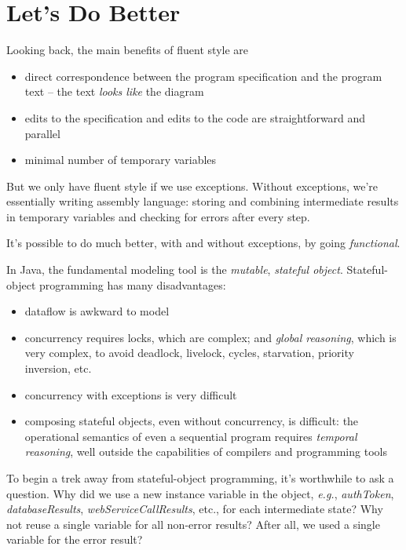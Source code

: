 \documentclass[11pt]{article}
\begin{document}
\section{Let's Do Better}
\label{sec-3}

Looking back, the main benefits of fluent style are
\begin{itemize}
\item direct correspondence between the program specification and the
program text -- the text \emph{looks like} the diagram
\item edits to the specification and edits to the code are
straightforward and parallel
\item minimal number of temporary variables
\end{itemize}

But we only have fluent style if we use exceptions. Without
exceptions, we're essentially writing assembly language: storing and
combining intermediate results in temporary variables and checking
for errors after every step.

It's possible to do much better, with
and without exceptions, by going \emph{functional}.

In Java, the fundamental modeling tool is the \emph{mutable}, \emph{stateful
object}. Stateful-object programming has many disadvantages:
\begin{itemize}
\item dataflow is awkward to model
\item concurrency requires locks, which are complex; and \emph{global
reasoning}, which is very complex, to avoid deadlock, livelock,
cycles, starvation, priority inversion, etc.
\item concurrency with exceptions is very difficult
\item composing stateful objects, even without concurrency, is
difficult: the operational semantics of even a sequential program
requires \emph{temporal reasoning}, well outside the capabilities of
compilers and programming tools
\end{itemize}

To begin a trek away from stateful-object programming, it's
worthwhile to ask a question. Why did we use a new instance variable
in the object, \emph{e.g.}, \emph{authToken}, \emph{databaseResults},
\emph{webServiceCallResults}, etc., for each intermediate state? Why not
reuse a single variable for all non-error results? After all, we
used a single variable for the error result?
\end{document}
